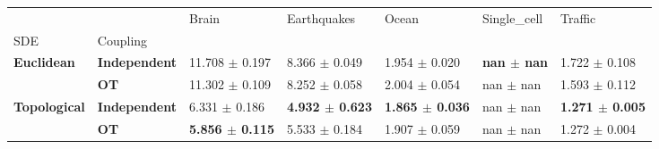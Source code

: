 \begin{tabular}{lllllll}
\toprule
 &  & Brain & Earthquakes & Ocean & Single_cell & Traffic \\
SDE & Coupling &  &  &  &  &  \\
\midrule
\multirow[t]{2}{*}{\textbf{Euclidean}} & \textbf{Independent} & 11.708 \(\pm\) 0.197 & 8.366 \(\pm\) 0.049 & 1.954 \(\pm\) 0.020 & \textbf{nan \(\pm\) nan} & 1.722 \(\pm\) 0.108 \\
\textbf{} & \textbf{OT} & 11.302 \(\pm\) 0.109 & 8.252 \(\pm\) 0.058 & 2.004 \(\pm\) 0.054 & nan \(\pm\) nan & 1.593 \(\pm\) 0.112 \\
\cline{1-7}
\multirow[t]{2}{*}{\textbf{Topological}} & \textbf{Independent} & 6.331 \(\pm\) 0.186 & \textbf{4.932 \(\pm\) 0.623} & \textbf{1.865 \(\pm\) 0.036} & nan \(\pm\) nan & \textbf{1.271 \(\pm\) 0.005} \\
\textbf{} & \textbf{OT} & \textbf{5.856 \(\pm\) 0.115} & 5.533 \(\pm\) 0.184 & 1.907 \(\pm\) 0.059 & nan \(\pm\) nan & 1.272 \(\pm\) 0.004 \\
\cline{1-7}
\bottomrule
\end{tabular}
